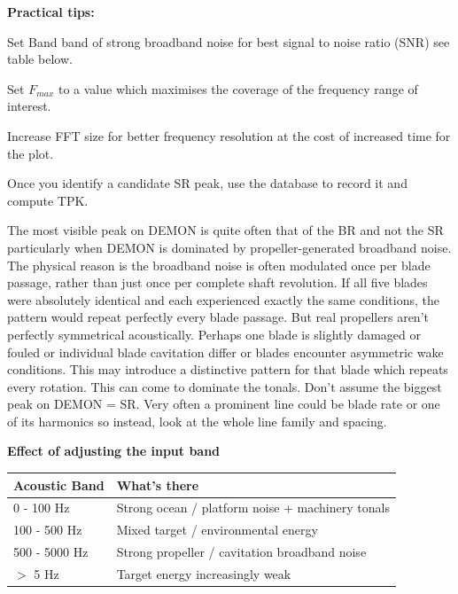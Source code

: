 \textbf{Practical tips:}

\begin{compactitem}
    \item Set Band band of strong broadband noise for best signal to noise ratio (SNR) see table below.
    \item Set $F_{max}$ to a value which maximises the coverage of the frequency range of interest.
    \item Increase FFT size for better frequency resolution at the cost of increased time for the plot.
    \item Once you identify a candidate SR peak, use the database to record it and compute TPK.
\end{compactitem}

\begin{learnpoint}
    The most visible peak on DEMON is quite often that of the BR and not the SR particularly when DEMON is dominated by propeller-generated broadband noise. The physical reason is the broadband noise is often modulated once per blade passage, rather than just once per complete shaft revolution. If all five blades were absolutely identical and each experienced exactly the same conditions, the pattern would repeat perfectly every blade passage. But real propellers aren't perfectly symmetrical acoustically. Perhaps one blade is slightly damaged or fouled or individual blade cavitation differ or blades encounter asymmetric wake conditions. This may introduce a distinctive pattern for that blade which repeats every rotation. This can come to dominate the tonals. Don't assume the biggest peak on DEMON = SR. Very often a prominent line could be blade rate or one of its harmonics so instead, look at the whole line family and spacing.
\end{learnpoint}

\textbf{Effect of adjusting the input band}

\begin{tabularx}{\linewidth}{l X}
    \toprule
    \textbf{Acoustic Band} & \textbf{What's there} \\
    \midrule
    \rowcolor[gray]{.9}0 - 100 Hz & Strong ocean / platform noise + machinery tonals \\
    100 - 500 Hz& Mixed target / environmental energy \\
    \rowcolor[gray]{.9}500 - 5000 Hz & Strong propeller / cavitation broadband noise\\
    $>$ 5 Hz & Target energy increasingly weak \\
    \bottomrule
\end{tabularx}

